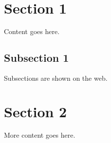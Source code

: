 \documentclass[a4paper]{article}
\begin{document}
\section{Section 1}
Content goes here.
\subsection{Subsection 1}
Subsections are shown on the web.
\section{Section 2}
More content goes here.
\end{document}
